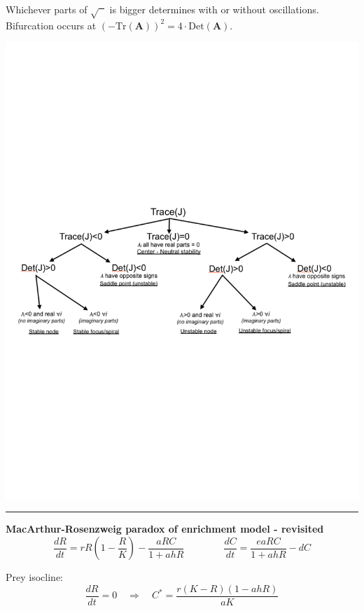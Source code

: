 \documentclass{article}
\newcommand{\ind}{\-\hspace{1cm}}
\begin{document}
\ind Whichever parts of $\sqrt{\phantom{x}}$ is bigger determines with or without oscillations.\\
\ind Bifurcation occurs at $(-\text{Tr}(\textbf{A}))^2 = 4\cdot \text{Det}(\textbf{A})$.\\
\begin{center}
 	\includegraphics[width=16cm]{figs/Classify}
\end{center}
 
\rule[0.5ex]{\linewidth}{1pt}
\pagebreak

\textbf{MacArthur-Rosenzweig paradox of enrichment model - revisited}
\begin{equation*}
	\frac{dR}{dt}=rR\left( 1-\frac{R}{K}\right) - \frac{aRC}{1+ahR} \qquad \qquad
	\frac{dC}{dt}=\frac{eaRC}{1+ahR} - dC
\end{equation*}

Prey isocline:
\begin{equation*}
	\frac{dR}{dt}=0 \quad \Rightarrow \quad C^*= \frac{r(K-R)(1-ahR)}{aK}
\end{equation*}
\end{document}
